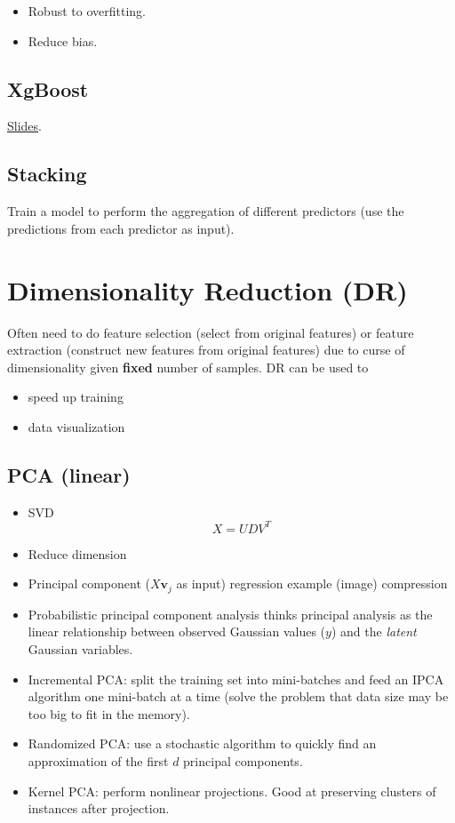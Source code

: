 \documentclass[12pt,oneside,a4paper]{article}
\numberwithin{equation}{section}
\begin{document}
\begin{itemize}
\item Robust to overfitting.
\item Reduce bias.
\end{itemize}

\subsection{XgBoost}

\href{https://homes.cs.washington.edu/~tqchen/pdf/BoostedTree.pdf}{Slides}.
\subsection{Stacking}
Train a model to perform the aggregation of different predictors (use the predictions from each predictor as input).
\section{Dimensionality Reduction (DR)}
Often need to do feature selection (select from original features) or feature extraction (construct new features from original features) due to curse of dimensionality given \textbf{fixed} number of samples.
DR can be used to 
\begin{itemize}
\item speed up training
\item data visualization
\end{itemize}

\subsection{PCA (linear)}
\begin{itemize}
\item SVD 
\begin{equation}
X = UDV^T
\end{equation}

\item Reduce dimension 
\item Principal component ($X\boldsymbol{v}_j$ as input) regression example (image) compression
\item Probabilistic principal component analysis thinks principal analysis as the linear relationship between observed Gaussian values ($y$) and the \emph{latent} Gaussian variables. 
\item Incremental PCA: split the training set into mini-batches and feed an IPCA algorithm one mini-batch at a time (solve the problem that data size may be too big to fit in the memory).
\item Randomized PCA: use a stochastic algorithm to quickly find an approximation of the first $d$ principal components. 
\item Kernel PCA: perform nonlinear projections. Good at preserving clusters of instances after projection. 
\end{itemize}
\end{document}
